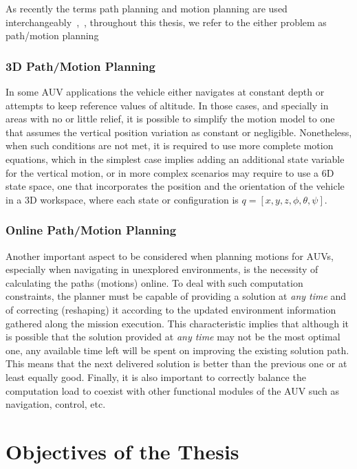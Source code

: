 As recently the terms path planning and motion planning are used
interchangeably~\cite{Sucan2011},~\cite{LaValle2006}, throughout this thesis, we
refer to the either problem as path/motion planning

\subsubsection{3D Path/Motion Planning}

In some \ac{AUV} applications the vehicle either navigates at constant depth or
attempts to keep reference values of altitude. In those cases, and specially in
areas with no or little relief, it is possible to simplify the motion model to
one that assumes the vertical position variation as constant or negligible.
Nonetheless, when such conditions are not met, it is required to use more
complete motion equations, which in the simplest case implies adding an
additional state variable for the vertical motion, or in more complex scenarios
may require to use a \ac{6D} state space, \ie one that incorporates the position
and the orientation of the vehicle in a \ac{3D} workspace, where each state or
configuration is $q = [x,y,z, \phi, \theta, \psi]$.
 
\subsubsection{Online Path/Motion Planning}

Another important aspect to be considered when planning motions for \acp{AUV},
especially when navigating in unexplored environments, is the necessity of
calculating the paths (motions) online. To deal with such computation
constraints, the planner must be capable of providing a solution at \textit{any
time} and of correcting (reshaping) it according to the updated environment
information gathered along the mission execution. This characteristic implies
that although it is possible that the solution provided at \textit{any time} may
not be the most optimal one, any available time left will be spent on improving
the existing solution path. This means that the next delivered solution is
better than the previous one or at least equally good. Finally, it is also
important to correctly balance the computation load to coexist with other
functional modules of the \ac{AUV} such as navigation, control, etc.

\section{Objectives of the Thesis}


